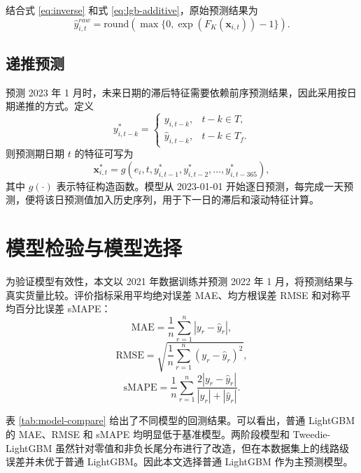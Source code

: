 \documentclass[UTF8,zihao=-4,a4paper,fontset=fandol]{ctexart}
\begin{document}
结合式 \eqref{eq:inverse} 和式 \eqref{eq:lgb-additive}，原始预测结果为
\begin{equation}
  \hat y_{i,t}^{raw}
  =\mathrm{round}\left(\max\{0,\exp(F_K(\boldsymbol{x}_{i,t}))-1\}\right).
  \label{eq:raw-pred}
\end{equation}

\subsection{递推预测}

预测 2023 年 1 月时，未来日期的滞后特征需要依赖前序预测结果，因此采用按日期递推的方式。定义
\begin{equation}
  y^{*}_{i,t-k}=
  \begin{cases}
  y_{i,t-k}, & t-k\in T,\\
  \hat y_{i,t-k}, & t-k\in T_f.
  \end{cases}
  \label{eq:recursive-value}
\end{equation}
则预测期日期 $t$ 的特征可写为
\begin{equation}
  \boldsymbol{x}^{*}_{i,t}
  =g(e_i,t,y^{*}_{i,t-1},y^{*}_{i,t-2},\ldots,y^{*}_{i,t-365}),
  \label{eq:recursive-feature}
\end{equation}
其中 $g(\cdot)$ 表示特征构造函数。模型从 2023-01-01 开始逐日预测，每完成一天预测，便将该日预测值加入历史序列，用于下一日的滞后和滚动特征计算。

\section{模型检验与模型选择}

为验证模型有效性，本文以 2021 年数据训练并预测 2022 年 1 月，将预测结果与真实货量比较。评价指标采用平均绝对误差 MAE、均方根误差 RMSE 和对称平均百分比误差 sMAPE：
\begin{equation}
  \mathrm{MAE}=\frac{1}{n}\sum_{r=1}^{n}|y_r-\hat y_r|,
  \label{eq:mae}
\end{equation}
\begin{equation}
  \mathrm{RMSE}=\sqrt{\frac{1}{n}\sum_{r=1}^{n}(y_r-\hat y_r)^2},
  \label{eq:rmse}
\end{equation}
\begin{equation}
  \mathrm{sMAPE}=\frac{1}{n}\sum_{r=1}^{n}
  \frac{2|y_r-\hat y_r|}{|y_r|+|\hat y_r|}.
  \label{eq:smape}
\end{equation}

表 \ref{tab:model-compare} 给出了不同模型的回测结果。可以看出，普通 LightGBM 的 MAE、RMSE 和 sMAPE 均明显低于基准模型。两阶段模型和 Tweedie-LightGBM 虽然针对零值和非负长尾分布进行了改造，但在本数据集上的线路级误差并未优于普通 LightGBM。因此本文选择普通 LightGBM 作为主预测模型。
\end{document}

